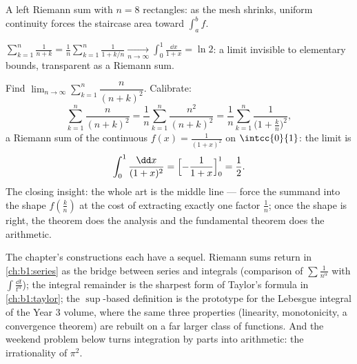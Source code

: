 \begin{omfigure}

{\small A left Riemann sum with $n = 8$ rectangles: as the mesh
shrinks, uniform continuity forces the staircase area toward
$\int_a^b f$.}
\end{omfigure}

\begin{example}\label{ex:b1:integration:riemannexample}
$\displaystyle\sum_{k=1}^{n} \frac{1}{n + k} = \frac 1n
\sum_{k=1}^{n} \frac{1}{1 + k/n} \xrightarrow[n\to\infty]{}
\int_0^1 \frac{\dd x}{1 + x} = \ln 2$: a limit invisible to
elementary bounds, transparent as a Riemann sum.
\end{example}

\begin{example}\label{ex:b1:integration:riemann2}
Find $\lim_{n\to\infty} \sum_{k=1}^{n} \dfrac{n}{(n+k)^2}$.
Calibrate:
\[
\sum_{k=1}^{n} \frac{n}{(n+k)^2}
= \frac{1}{n}\sum_{k=1}^{n} \frac{n^2}{(n+k)^2}
= \frac1n \sum_{k=1}^{n} \frac{1}{\bigl(1 + \frac kn\bigr)^2} ,
\]
a Riemann sum of the continuous $f(x) = \frac{1}{(1+x)^2}$ on
$\intcc{0}{1}$: the limit is
\[
\int_0^1 \frac{\dd x}{(1 + x)^2}
= \Bigl[-\frac{1}{1+x}\Bigr]_0^1 = \frac12 .
\]
The closing insight: the whole art is the middle line ---
force the summand into the shape $f(\frac kn)$ at the cost of
extracting exactly one factor $\frac1n$; once the shape is
right, the theorem does the analysis and the fundamental theorem
does the arithmetic.
\end{example}

\begin{remark}
The chapter's constructions each have a sequel. Riemann sums
return in \cref{ch:b1:series} as the bridge between series and
integrals (comparison of $\sum \frac{1}{n^\alpha}$ with $\int
\frac{\dd t}{t^\alpha}$); the integral remainder is the sharpest
form of Taylor's formula in \cref{ch:b1:taylor}; the
$\sup$-based definition is the prototype for the Lebesgue
integral of the Year 3 volume, where the same three properties
(linearity, monotonicity, a convergence theorem) are rebuilt on a
far larger class of functions. And the weekend problem below
turns integration by parts into arithmetic: the irrationality of
$\pi^2$.
\end{remark}

